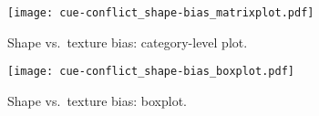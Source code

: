 \begin{figure}[h]
	\texttt{[image: cue-conflict\_shape-bias\_matrixplot.pdf]}
	\caption{Shape vs.\ texture bias: category-level plot.}
\end{figure}\hfill


\begin{figure}[h]
	\texttt{[image: cue-conflict\_shape-bias\_boxplot.pdf]}
	\caption{Shape vs.\ texture bias: boxplot.}
\end{figure}\hfill
